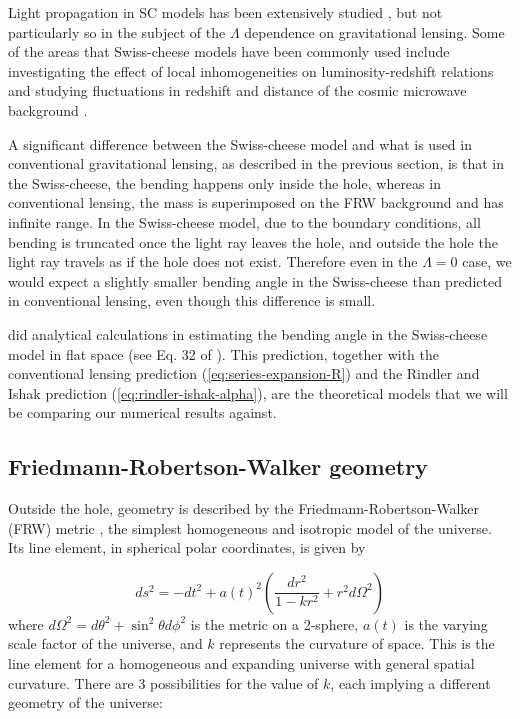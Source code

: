 Light propagation in SC models has been extensively studied \citep{szybka2011light,vanderveld2008luminosity,fleury2014swiss}, but not particularly so in the subject of the $\Lambda$ dependence on gravitational lensing. Some of the areas that Swiss-cheese models have been commonly used include investigating the effect of local inhomogeneities on luminosity-redshift relations \citep{kantowski1969corrections,fleury2013interpretation} and studying fluctuations in redshift and distance of the cosmic microwave background \citep{bolejko2009szekeres,valkenburg2009swiss,bolejko2011effect}. 

A significant difference between the Swiss-cheese model and what is used in conventional gravitational lensing, as described in the previous section, is that in the Swiss-cheese, the bending happens only inside the hole, whereas in conventional lensing, the mass is superimposed on the FRW background and has infinite range. In the Swiss-cheese model, due to the boundary conditions, all bending is truncated once the light ray leaves the hole, and outside the hole the light ray travels as if the hole does not exist. Therefore even in the $\Lambda = 0$ case, we would expect a slightly smaller bending angle in the Swiss-cheese than predicted in conventional lensing, even though this difference is small. 

\citet{kantowski2010gravitational} did analytical calculations in estimating the bending angle in the Swiss-cheese model in flat space (see Eq. 32 of \citet{kantowski2010gravitational}). This prediction, together with the conventional lensing prediction (\autoref{eq:series-expansion-R}) and the Rindler and Ishak prediction (\autoref{eq:rindler-ishak-alpha}), are the theoretical models that we will be comparing our numerical results against. 


\subsection{Friedmann-Robertson-Walker geometry}

Outside the hole, geometry is described by the Friedmann-Robertson-Walker (FRW) metric \cite{wald2010general}, the simplest homogeneous and isotropic model of the universe. Its line element, in spherical polar coordinates, is given by

\begin{equation}
  ds^2 = -dt^2 + a(t)^2 \left ( \frac{dr^2}{1-kr^2} + r^2 d \Omega^2 \right )
  \label{eq:frw-metric}
\end{equation}
where $d \Omega^2 = d\theta^2 + \sin^2\theta d\phi^2$ is the metric on a 2-sphere, $a(t)$ is the varying scale factor of the universe, and $k$ represents the curvature of space. This is the line element for a homogeneous and expanding universe with general spatial curvature. There are 3 possibilities for the value of $k$, each implying a different geometry of the universe:

